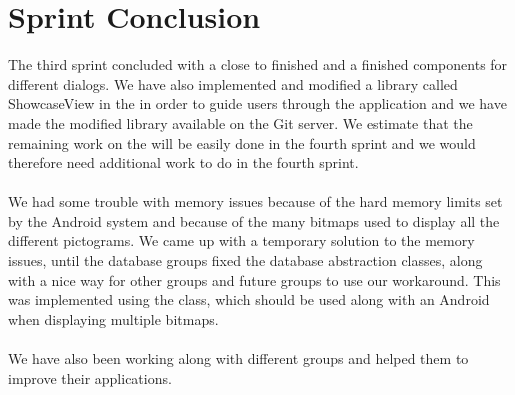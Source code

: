 
\chapter{Sprint Conclusion}
\label{cha:conclusion_sprint_3}

The third sprint concluded with a close to finished \ct and a finished components for different dialogs. We have also implemented and modified a library called ShowcaseView in the \ct in order to guide users through the application and we have made the modified library available on the \giraf Git server. We estimate that the remaining work on the \ct will be easily done in the fourth sprint and we would therefore need additional work to do in the fourth sprint.
\\\\
We had some trouble with memory issues because of the hard memory limits set by the Android system and because of the many bitmaps used to display all the different pictograms. We came up with a temporary solution to the memory issues, until the database groups fixed the database abstraction classes, along with a nice way for other groups and future groups to use our workaround. This was implemented using the  class, which should be used along with an Android  when displaying multiple bitmaps.
\\\\
We have also been working along with different groups and helped them to improve their applications. 

